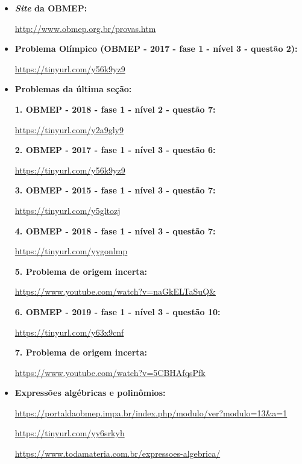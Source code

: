 \documentclass[a4paper, 12pt]{article}
\begin{document}
\begin{itemize}

\item	\textbf{\textit{Site} da OBMEP: }

	\url{http://www.obmep.org.br/provas.htm}
	
\item   \textbf{Problema Olímpico (OBMEP - 2017 - fase 1 - nível 3 - questão 2): }

    \url{https://tinyurl.com/y56k9yz9}

\item   \textbf{Problemas da última seção:} 

\textbf{1. OBMEP - 2018 - fase 1 - nível 2 - questão 7:}

\url{https://tinyurl.com/y2a9gly9}

\textbf{2. OBMEP - 2017 - fase 1 - nível 3 - questão 6:}

\url{https://tinyurl.com/y56k9yz9}

\textbf{3. OBMEP - 2015 - fase 1 - nível 3 - questão 7:}

\url{https://tinyurl.com/y5gltozj}

\textbf{4. OBMEP - 2018 - fase 1 - nível 3 - questão 7:}

\url{https://tinyurl.com/yygonlmp}

\textbf{5. Problema de origem incerta:}

\url{https://www.youtube.com/watch?v=naGkELTaSuQ&} 

\textbf{6. OBMEP - 2019 - fase 1 - nível 3 - questão 10:}

\url{https://tinyurl.com/y63x9cnf}

\textbf{7. Problema de origem incerta:}
 
\url{https://www.youtube.com/watch?v=5CBHAfqsPfk}
    
\item   \textbf{Expressões algébricas e polinômios:} 

    \url{https://portaldaobmep.impa.br/index.php/modulo/ver?modulo=13&a=1}

    \url{https://tinyurl.com/yy6srkyh}

    \url{https://www.todamateria.com.br/expressoes-algebrica/} 


\end{itemize}
\end{document}
